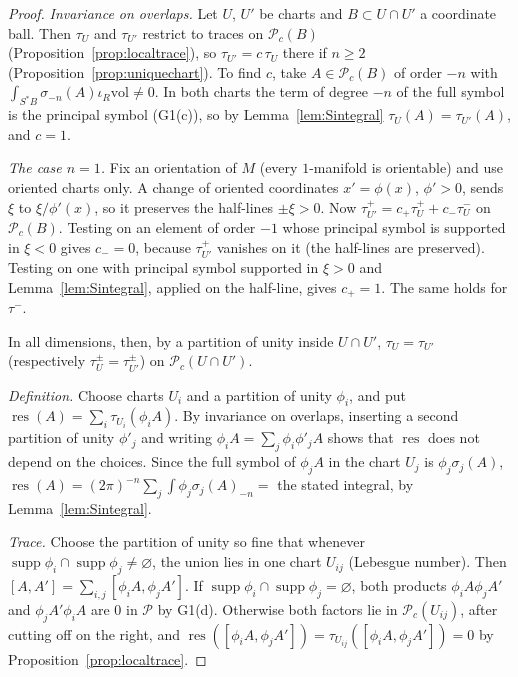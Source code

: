 \documentclass[11pt,oneside,reqno]{article}
\DeclareMathOperator{\res}{res}
\DeclareMathOperator{\supp}{supp}
\newcommand{\cP}{\mathcal P}
\newcommand{\vol}{\mathrm{vol}}
\theoremstyle{plain}
\theoremstyle{definition}
\theoremstyle{remark}
\begin{document}
\begin{proof}
\emph{Invariance on overlaps.} Let \(U\), \(U'\) be charts and \(B\subset U\cap U'\) a coordinate ball.
Then \(\tau_U\) and \(\tau_{U'}\) restrict to traces on \(\cP_c(B)\) (Proposition~\ref{prop:localtrace}),
so \(\tau_{U'}=c\,\tau_U\) there if \(n\ge2\) (Proposition~\ref{prop:uniquechart}). To find \(c\), take \(A\in\cP_c(B)\) of
order \(-n\) with \(\int_{S^*B}\sigma_{-n}(A)\iota_R\vol\ne0\). In both charts the term of degree
\(-n\) of the full symbol is the principal symbol (G1(c)), so by
Lemma~\ref{lem:Sintegral} \(\tau_U(A)=\tau_{U'}(A)\), and \(c=1\).

\emph{The case \(n=1\).} Fix an orientation of \(M\) (every \(1\)-manifold is orientable) and
use oriented charts only. A change of oriented coordinates \(x'=\phi(x)\), \(\phi'>0\),
sends \(\xi\) to \(\xi/\phi'(x)\), so it preserves the half-lines \(\pm\xi>0\). Now
\(\tau^+_{U'}=c_+\tau^+_U+c_-\tau^-_U\) on \(\cP_c(B)\). Testing on an element of order \(-1\) whose
principal symbol is supported in \(\xi<0\) gives \(c_-=0\), because \(\tau^+_{U'}\) vanishes on it
(the half-lines are preserved). Testing on one with principal symbol supported in
\(\xi>0\) and Lemma~\ref{lem:Sintegral}, applied on the half-line, gives \(c_+=1\). The same
holds for \(\tau^-\).

In all dimensions, then, by a partition of unity inside \(U\cap U'\), \(\tau_U=\tau_{U'}\) (respectively \(\tau^\pm_U=\tau^\pm_{U'}\)) on \(\cP_c(U\cap U')\).

\emph{Definition.} Choose charts \(U_i\) and a partition of unity \(\phi_i\), and put
\(\res(A)=\sum_i\tau_{U_i}(\phi_iA)\). By invariance on overlaps, inserting a second partition
of unity \(\phi'_j\) and writing \(\phi_iA=\sum_j\phi_i\phi'_jA\) shows that \(\res\) does not depend on
the choices. Since the full symbol of \(\phi_jA\) in the chart \(U_j\) is \(\phi_j\sigma_j(A)\),
\(\res(A)=(2\pi)^{-n}\sum_j\int\phi_j\sigma_j(A)_{-n}=\) the stated integral, by
Lemma~\ref{lem:Sintegral}.

\emph{Trace.} Choose the partition of unity so fine that whenever
\(\supp\phi_i\cap\supp\phi_j\ne\varnothing\), the union lies in one chart \(U_{ij}\) (Lebesgue number).
Then \([A,A']=\sum_{i,j}[\phi_iA,\phi_jA']\). If \(\supp\phi_i\cap\supp\phi_j=\varnothing\), both products
\(\phi_iA\phi_jA'\) and \(\phi_jA'\phi_iA\) are \(0\) in \(\cP\) by G1(d). Otherwise both factors lie in
\(\cP_c(U_{ij})\), after cutting off on the right, and \(\res([\phi_iA,\phi_jA'])=
\tau_{U_{ij}}([\phi_iA,\phi_jA'])=0\) by Proposition~\ref{prop:localtrace}.
\end{proof}
\end{document}
